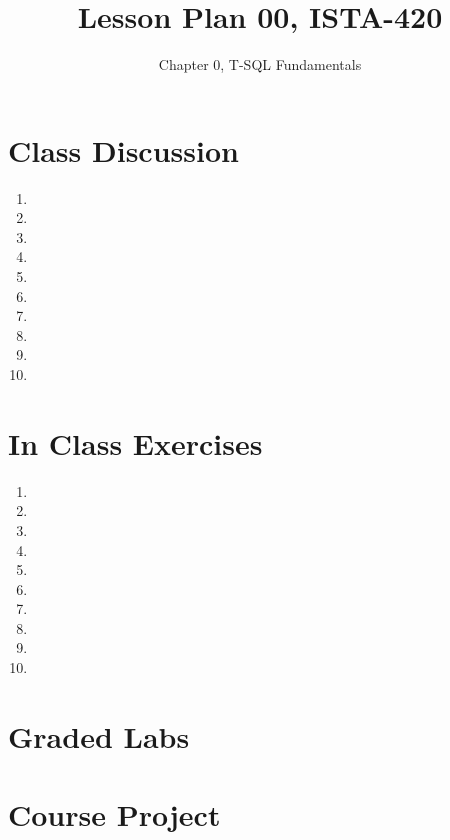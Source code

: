 \documentclass{article}
\title{Lesson Plan 00, ISTA-420}
\author{Chapter 0, T-SQL Fundamentals}
\date{}
\begin{document}
    

    \maketitle{}

    \section{Class Discussion}

    \begin{enumerate}
        \item 
        \item 
        \item 
        \item 
        \item 
        \item 
        \item 
        \item 
        \item 
        \item 
    \end{enumerate}

    \section{In Class Exercises}

    \begin{enumerate}
        \item 
        \item 
        \item 
        \item 
        \item 
        \item 
        \item 
        \item 
        \item 
        \item 
    \end{enumerate}

    \section{Graded Labs}



    \section{Course Project}
\end{document}
